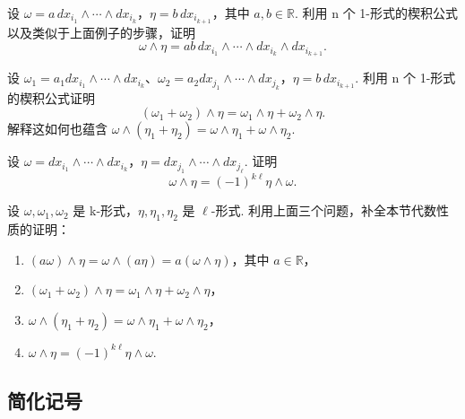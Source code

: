 \begin{question}\label{q:3-11}
设 $\omega=a\,dx_{i_1}\wedge\cdots\wedge dx_{i_k}$，$\eta=b\,dx_{i_{k+1}}$，其中 $a,b\in\mathbb{R}$. 利用 n 个 1-形式的楔积公式以及类似于上面例子的步骤，证明
\[
\omega\wedge\eta=ab\,dx_{i_1}\wedge\cdots\wedge dx_{i_k}\wedge dx_{i_{k+1}}.
\]
\end{question}

\begin{question}\label{q:3-12}
设 $\omega_1=a_1dx_{i_1}\wedge\cdots\wedge dx_{i_k}$、$\omega_2=a_2dx_{j_1}\wedge\cdots\wedge dx_{j_k}$，$\eta=b\,dx_{i_{k+1}}$. 利用 n 个 1-形式的楔积公式证明
\[
(\omega_1+\omega_2)\wedge\eta=\omega_1\wedge\eta+\omega_2\wedge\eta.
\]
解释这如何也蕴含 $\omega\wedge(\eta_1+\eta_2)=\omega\wedge\eta_1+\omega\wedge\eta_2$.
\end{question}

\begin{question}\label{q:3-13}
设 $\omega=dx_{i_1}\wedge\cdots\wedge dx_{i_k}$，$\eta=dx_{j_1}\wedge\cdots\wedge dx_{j_\ell}$. 证明
\[
\omega\wedge\eta=(-1)^{k\ell}\eta\wedge\omega.
\]
\end{question}

\begin{question}\label{q:3-14}
设 $\omega,\omega_1,\omega_2$ 是 k-形式，$\eta,\eta_1,\eta_2$ 是 $\ell$-形式. 利用上面三个问题，补全本节代数性质的证明：
\begin{enumerate}
  \item[(1)] $(a\omega)\wedge\eta=\omega\wedge(a\eta)=a(\omega\wedge\eta)$，其中 $a\in\mathbb{R}$，
  \item[(2)] $(\omega_1+\omega_2)\wedge\eta=\omega_1\wedge\eta+\omega_2\wedge\eta$，
  \item[(3)] $\omega\wedge(\eta_1+\eta_2)=\omega\wedge\eta_1+\omega\wedge\eta_2$，
  \item[(4)] $\omega\wedge\eta=(-1)^{k\ell}\eta\wedge\omega$.
\end{enumerate}
\end{question}

\subsection{简化记号}

